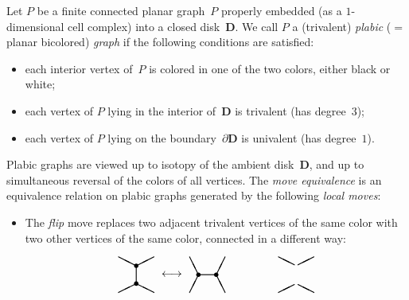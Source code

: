 \documentclass[ALCO,ThmDefs,Unicode,epreuves,published]{cedram}
\newcommand{\Disk}{{\mathbf{D}}}
\begin{document}
\begin{definition}
\label{def:plabic}
Let $P$ be a finite connected planar graph~$P$ properly embedded
(as a $1$-dimensional cell complex) into a closed disk~$\Disk$. 
We call $P$ a (trivalent) \emph{plabic} ($=$planar bicolored) \emph{graph}
if the following conditions are satisfied: 
\begin{itemize} %
\item
each interior vertex of~$P$ is colored in one of the two colors, either black or white; 
\item
each vertex of $P$ lying in the interior of~$\Disk$ is trivalent 
(\ie has degree~$3$);
\item 
each vertex of $P$ lying on the boundary~$\partial\Disk$ is univalent 
(\ie has degree~$1$). 
\end{itemize}
Plabic graphs are viewed up to isotopy of the ambient disk~$\Disk$, 
and up to simultaneous reversal of the colors of all vertices. 
The \emph{move equivalence} is an equivalence relation on plabic graphs 
generated by the following \emph{local moves}: 
\begin{itemize} %
\item The \emph{flip} move replaces two adjacent trivalent vertices of
 the same color with two other vertices of the same color, connected
 in a different way:
\[ 
\setlength{\unitlength}{0.8pt}
\begin{picture}(40,45)(0,0)
\thicklines
\put(0,0){\line(2,1){20}}
\put(20,30){\line(2,1){20}}
\put(0,40){\line(2,-1){20}}
\put(20,10){\line(2,-1){20}}
\put(20,10){\line(0,1){20}}
\put(20,10){\circle*{5}}
\put(20,30){\circle*{5}}
\end{picture}
\begin{picture}(40,40)(0,0)
\put(20,20){\makebox(0,0){$\longleftrightarrow$}}
\end{picture}
\begin{picture}(40,40)(0,0)
\thicklines
\put(0,0){\line(1,2){10}}
\put(30,20){\line(1,2){10}}
\put(40,0){\line(-1,2){10}}
\put(10,20){\line(-1,2){10}}
\put(10,20){\line(1,0){20}}
\put(10,20){\circle*{5}}
\put(30,20){\circle*{5}}
\end{picture}
\begin{picture}(60,40)(0,0)
\end{picture}
\begin{picture}(40,40)(0,0)
\thicklines
\put(0,0){\line(2,1){18}}
\put(40,40){\line(-2,-1){18}}
\put(0,40){\line(2,-1){18}}
\put(40,0){\line(-2,1){18}}

\end{picture}\]
\end{itemize}
\end{definition}
\end{document}
